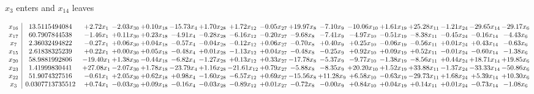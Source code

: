 \documentclass[9pt]{article}
\begin{document}
 $ x_{3} $ enters and $ x_{14} $ leaves 

 \[\begin{array}{c| c c@{\hskip 2pt} c@{\hskip 2pt} c@{\hskip 2pt} c@{\hskip 2pt} c@{\hskip 2pt} c@{\hskip 2pt} c@{\hskip 2pt} c@{\hskip 2pt} c@{\hskip 2pt} c@{\hskip 2pt} c@{\hskip 2pt} c@{\hskip 2pt} c@{\hskip 2pt} c@{\hskip 2pt} c@{\hskip 2pt} }
 x_{16}   &  13.5115494084 & +  2.72 x_{1} & -2.03 x_{30} & +  0.10 x_{18} & -15.73 x_{4} & +  1.70 x_{28} & +  1.72 x_{12} & -0.05 x_{27} & + 19.97 x_{8} & -7.10 x_{9} & -10.06 x_{10} & +  1.61 x_{19} & + 25.28 x_{11} & -1.21 x_{24} & -29.65 x_{14} & -29.17 x_{6}\\
 x_{17}   &  60.7907844538 & -1.46 x_{1} & +  0.11 x_{30} & +  0.23 x_{18} & -4.91 x_{4} & -0.28 x_{28} & -6.16 x_{12} & -0.20 x_{27} & -9.68 x_{8} & -7.41 x_{9} & -4.97 x_{10} & -0.51 x_{19} & -8.38 x_{11} & -0.45 x_{24} & -0.16 x_{14} & -4.43 x_{6}\\
 x_{7}   &  2.36032494822 & -0.27 x_{1} & +  0.06 x_{30} & +  0.04 x_{18} & -0.57 x_{4} & -0.04 x_{28} & -0.12 x_{12} & +  0.06 x_{27} & -0.70 x_{8} & +  0.40 x_{9} & +  0.25 x_{10} & -0.06 x_{19} & -0.56 x_{11} & +  0.01 x_{24} & +  0.43 x_{14} & -0.63 x_{6}\\
 x_{15}   &  2.61838325239 & +  0.22 x_{1} & +  0.00 x_{30} & +  0.05 x_{18} & -0.48 x_{4} & +  0.01 x_{28} & -1.13 x_{12} & +  0.04 x_{27} & -0.48 x_{8} & -0.25 x_{9} & +  0.92 x_{10} & +  0.09 x_{19} & +  0.52 x_{11} & -0.01 x_{24} & -0.60 x_{14} & -1.38 x_{6}\\
 x_{20}   &  58.9881992806 & -19.40 x_{1} & +  1.38 x_{30} & -0.44 x_{18} & -6.82 x_{4} & -1.27 x_{28} & +  0.13 x_{12} & +  0.33 x_{27} & -17.78 x_{8} & -5.37 x_{9} & -9.77 x_{10} & -1.38 x_{19} & -8.56 x_{11} & +  0.44 x_{24} & + 18.71 x_{14} & + 19.85 x_{6}\\
 x_{23}   &  1.41999830441 & + 27.08 x_{1} & -2.07 x_{30} & +  1.78 x_{18} & -23.79 x_{4} & +  1.16 x_{28} & -21.61 x_{12} & +  0.79 x_{27} & -5.88 x_{8} & -8.35 x_{9} & + 20.20 x_{10} & +  1.52 x_{19} & + 33.88 x_{11} & -1.37 x_{24} & -33.33 x_{14} & -50.86 x_{6}\\
 x_{22}   &  51.9074327516 & -0.61 x_{1} & +  2.05 x_{30} & +  0.62 x_{18} & +  0.98 x_{4} & -1.60 x_{28} & -6.57 x_{12} & +  0.69 x_{27} & -15.56 x_{8} & + 11.28 x_{9} & +  6.58 x_{10} & -0.63 x_{19} & -29.73 x_{11} & +  1.68 x_{24} & +  5.39 x_{14} & + 10.30 x_{6}\\
 x_{3}   &  0.0307713735512 & +  0.74 x_{1} & -0.03 x_{30} & +  0.09 x_{18} & -0.16 x_{4} & -0.03 x_{28} & -0.89 x_{12} & +  0.01 x_{27} & -0.72 x_{8} & -0.00 x_{9} & +  0.84 x_{10} & +  0.04 x_{19} & +  0.14 x_{11} & +  0.01 x_{24} & -0.73 x_{14} & -1.08 x_{6}\\

\end{array}\]
\end{document}
